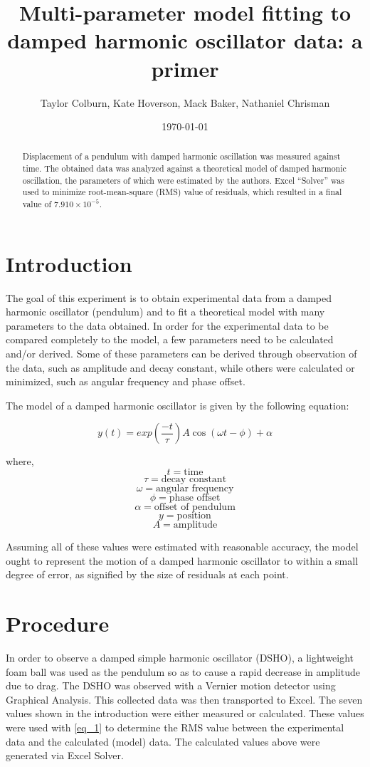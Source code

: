 \documentclass{article}
\author{Taylor Colburn, Kate Hoverson, Mack Baker, Nathaniel Chrisman}
\title{Multi-parameter model fitting to damped harmonic oscillator data: a primer }
\date{\today}
\begin{document}
  \maketitle
  \begin{abstract}
    Displacement of a pendulum with damped harmonic oscillation was measured against time. The obtained data was analyzed against a theoretical model of damped harmonic oscillation, the parameters of which were estimated by the authors. Excel “Solver” was used to minimize root-mean-square (RMS) value of residuals, which resulted in a final value of $7.910 \times 10^{-5}$.
  \end{abstract}
  \section{Introduction}

  The goal of this experiment is to obtain experimental data from a damped harmonic oscillator (pendulum) and to fit a theoretical model with many parameters to the data obtained. In order for the experimental data to be compared completely to the model, a few parameters need to be calculated and/or derived. Some of these parameters can be derived through observation of the data, such as amplitude and decay constant, while others were calculated or minimized, such as angular frequency and phase offset.

  The model of a damped harmonic oscillator is given by the following equation:

  \begin{equation} \label{eq_1}
    y(t) = exp\left(\dfrac{-t}{\tau}\right) A\cos{\left(\omega t - \phi \right)} + \alpha
  \end{equation}

  where,
  $$t = \text{time}$$
	$$\tau  = \text{decay constant}$$
	$$\omega = \text{angular frequency}$$
	$$\phi = \text{phase offset}$$
	$$\alpha = \text{offset of pendulum}$$
	$$y = \text{position}$$
	$$A = \text{amplitude}$$

  Assuming all of these values were estimated with reasonable accuracy, the model ought to represent the motion of a damped harmonic oscillator to within a small degree of error, as signified by the size of residuals at each point.

  \section{Procedure}

  In order to observe a damped simple harmonic oscillator (DSHO), a lightweight foam ball was used as the pendulum so as to cause a rapid decrease in amplitude due to drag. The DSHO was observed with a Vernier motion detector using Graphical Analysis. This collected data was then transported to Excel. The seven values shown in the introduction were either measured or calculated. These values were used with \ref{eq_1} to determine the RMS value between the experimental data and the calculated (model) data. The calculated values above were generated via Excel Solver.
\end{document}
